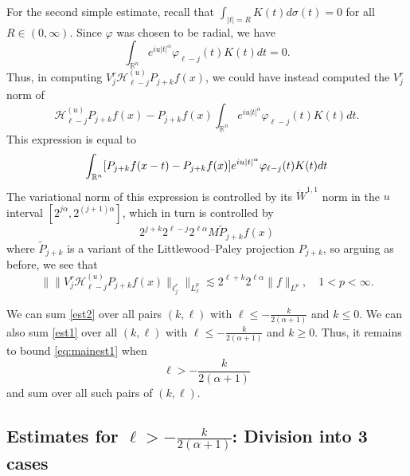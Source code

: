 \documentclass[12pt,leqno]{amsart}
\def\R{\mathbb{R}}
\theoremstyle{plain}
\numberwithin{equation}{section}
\begin{document}
For the second simple estimate, recall that $\int_{|t|=R} K(t) d\sigma(t) = 0$ for all $R \in (0, \infty)$. Since $\varphi$ was chosen to be radial, we have
\[
\int_{\R^n}  e^{i u |t|^{\alpha}} \varphi_{\ell-j}(t) K(t) dt = 0.
\]
Thus, in computing $V^{r}_j \mathcal{H}^{(u)}_{\ell-j} P_{j+k} f(x)$, we could have instead computed the $V^{r}_j$ norm of 
\[
\mathcal{H}^{(u)}_{\ell-j} P_{j+k} f(x) - P_{j+k}f(x) \int_{\R^n}  e^{i u |t|^{\alpha}} \varphi_{\ell-j}(t) K(t) dt.
\]
This expression is equal to
\begin{align}
\int_{\R^n} [P_{j+k}f(x-t) - P_{j+k}f(x)] e^{iu |t|^{\alpha}} \varphi_{\ell-j}(t) K(t) dt \notag \end{align}
The variational norm of this expression is controlled by its $\dot{W}^{1,1}$ norm in the $u$ interval $[2^{j\alpha}, 2^{(j+1)\alpha}]$, which in turn is controlled by
\[
2^{j+k} 2^{\ell-j} 2^{\ell \alpha} M \tilde{P}_{j+k} f(x)
\]	
where $\tilde{P}_{j+k}$ is a variant of the Littlewood--Paley projection $P_{j+k}$, so arguing as before, we see that
\begin{equation} \label{est2}
\| \| V^{r}_j \mathcal{H}^{(u)}_{\ell-j} P_{j+k} f(x) \|_{\ell^{r}_j} \|_{L^p_x} \lesssim 2^{\ell+k} 2^{\ell \alpha} \|f\|_{L^p}, \quad 1 < p < \infty.
\end{equation} 

We can sum \eqref{est2} over all pairs $(k,\ell)$ with $\ell \leq -\frac{k}{2(\alpha+1)}$ and $k \leq 0$. We can also sum \eqref{est1} over all $(k,\ell)$ with $\ell \leq -\frac{k}{2(\alpha+1)}$ and $k \geq 0$. Thus, it remains to bound \eqref{eq:mainest1} when 
\begin{equation} \label{eq:klcaseremain}
\ell > -\frac{k}{2(\alpha+1)}
\end{equation} 
and sum over all such pairs of $(k,\ell)$.

\subsection{Estimates for $\ell > -\frac{k}{2(\alpha+1)}$: Division into 3 cases} \label{sect4.3}
\end{document}
